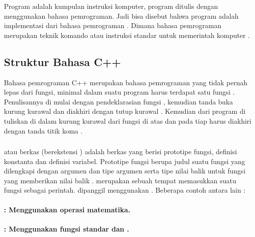 \documentclass[../main.tex]{subfiles}
\begin{document}
Program adalah kumpulan instruksi komputer, program ditulis dengan menggunakan bahasa pemrograman. Jadi bisa disebut bahwa program adalah implementasi dari bahasa pemrograman \parencite{utami10}. Dimana bahasa pemrograman merupakan teknik komando atau instruksi standar untuk memerintah komputer \parencite{dewi2010media}.

\subsection{Struktur Bahasa C++}

Bahasa pemrograman C++ merupakan bahasa pemrograman yang tidak pernah lepas dari fungsi, minimal dalam suatu program harus terdapat satu fungsi . Penulisannya di mulai dengan pendeklarasian fungsi ,  kemudian tanda buka kurung kurawal \citecode{\{} dan diakhiri dengan tutup kurawal \citecode{\}}. Kemudian {\statement} dari program di tuliskan di dalam kurung kurawal dari fungsi  di atas dan pada tiap {\statement} harus diakhiri dengan tanda titik koma \citecode{;} \parencite{friyadi2005panduan}.

\subsubsection{{\Header} {\file}}

\begin{indentpar}\hpar{}
    {\Header} {\file} atau berkas {\header} (berekstensi ) adalah berkas yang berisi prototipe fungsi, definisi konstanta dan definisi variabel. Prototipe fungsi berupa judul suatu fungsi yang dilengkapi dengan argumen dan tipe argumen serta tipe nilai balik untuk fungsi yang memberikan nilai balik \parencite{kadir2005heriyanto}. {\Header} {\file} merupakan sebuah tempat memasukkan suatu fungsi sebagai perintah. {\Header} {\file} dipanggil menggunakan {\directive} . Beberapa contoh {\header} {\file} antara lain \parencite{friyadi2005panduan}:
\end{indentpar}
\paragraph{	: Menggunakan operasi matematika.}
\paragraph{	: Menggunakan fungsi standar {\ioi} dan {\ioo}.}
\end{document}
